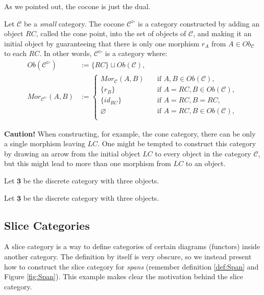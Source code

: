 As we pointed out, the cocone is just the dual.

\begin{definition}
	Let $\mathcal C$ be a \textit{small} category. The cocone $\mathcal C^{\rhd}$ is a category constructed
	by adding an object $RC$, called the cone point, into the set of objects of $\mathcal C$,
	and making it an initial object by guaranteeing that there is only one morphism $r_A$ from $A \in Ob_\mathcal C$ to each
	$RC$. In other words, $\mathcal C^{\rhd}$ is a category where:
	\begin{align*}
		Ob(\mathcal C^{\rhd})        & := \{RC\} \sqcup Ob(\mathcal C), \\
		Mor_{\mathcal C^{\rhd}}(A,B) & :=
		\begin{cases}
			Mor_\mathcal C (A,B)  \quad & \text{if } A,B \in Ob(\mathcal C),       \\
			\{r_B\} \quad               & \text{if } A = RC, B \in Ob(\mathcal C), \\
			\{id_{RC}\}  \quad          & \text{if } A = RC, B = RC,               \\
			\varnothing  \quad          & \text{if } A = RC, B \in Ob(\mathcal C), \\
		\end{cases}
	\end{align*}
\end{definition}

\textbf{Caution!} When constructing, for example, the cone category, there can
be only a single morphism leaving $LC$. One might be tempted to construct this
category by drawing an arrow from the initial object $LC$ to every object
in the category $\mathcal C$, but this might lead to more than one morphism
from $LC$ to an object.

\begin{example}
	Let $\mathbf{\underline{3}}$ be the discrete category with three objects.
\end{example}

\begin{example}
	Let $\mathbf{\underline{3}}$ be the discrete category with three objects.
\end{example}


\subsection{Slice Categories}

A slice category is a way to define categories of certain diagrams (functors) inside another category.
The definition by itself is very obscure, so we instead present how to construct the slice
category for \textit{spans} (remember definition \ref{def:Span} and Figure \ref{fig:Span}).
This example makes clear the motivation behind the slice category.

